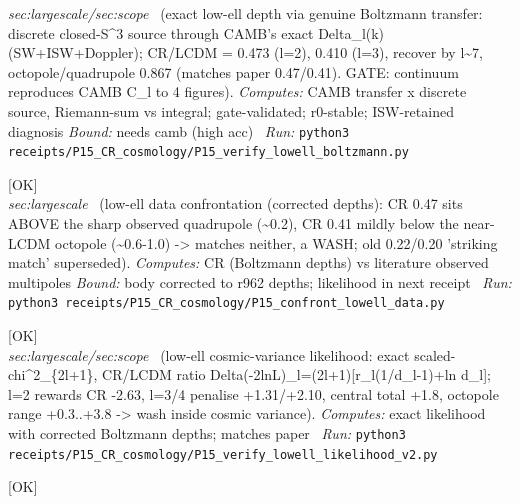 \begin{description}
\textit{sec:largescale/sec:scope} \ (exact low-ell depth via genuine Boltzmann transfer: discrete closed-S\textasciicircum{}3 source through CAMB's exact Delta\_l(k) (SW+ISW+Doppler); CR/LCDM = 0.473 (l=2), 0.410 (l=3), recover by l\textasciitilde{}7, octopole/quadrupole 0.867 (matches paper 0.47/0.41). GATE: continuum reproduces CAMB C\_l to 4 figures). 
\emph{Computes:} CAMB transfer x discrete source, Riemann-sum vs integral; gate-validated; r0-stable; ISW-retained diagnosis
 \emph{Bound:} needs camb (high acc)
\ \emph{Run:} \texttt{python3 receipts/P15\_CR\_cosmology/P15\_verify\_lowell\_boltzmann.py}
\item[\label{rcpt:P15_confront_lowell_data}\texttt{P15\_confront\_lowell\_data}]\hfill\textsf{[OK]}\\
\textit{sec:largescale} \ (low-ell data confrontation (corrected depths): CR 0.47 sits ABOVE the sharp observed quadrupole (\textasciitilde{}0.2), CR 0.41 mildly below the near-LCDM octopole (\textasciitilde{}0.6-1.0) -> matches neither, a WASH; old 0.22/0.20 'striking match' superseded). 
\emph{Computes:} CR (Boltzmann depths) vs literature observed multipoles
 \emph{Bound:} body corrected to r962 depths; likelihood in next receipt
\ \emph{Run:} \texttt{python3 receipts/P15\_CR\_cosmology/P15\_confront\_lowell\_data.py}
\item[\label{rcpt:P15_verify_lowell_likelihood_v2}\texttt{P15\_verify\_lowell\_likelihood\_v2}]\hfill\textsf{[OK]}\\
\textit{sec:largescale/sec:scope} \ (low-ell cosmic-variance likelihood: exact scaled-chi\textasciicircum{}2\_\{2l+1\}, CR/LCDM ratio Delta(-2lnL)\_l=(2l+1)[r\_l(1/d\_l-1)+ln d\_l]; l=2 rewards CR -2.63, l=3/4 penalise +1.31/+2.10, central total +1.8, octopole range +0.3..+3.8 -> wash inside cosmic variance). 
\emph{Computes:} exact likelihood with corrected Boltzmann depths; matches paper
\ \emph{Run:} \texttt{python3 receipts/P15\_CR\_cosmology/P15\_verify\_lowell\_likelihood\_v2.py}
\item[\label{rcpt:P15_the_low_ell_minimum_is_at_ell_four}\texttt{P15\_the\_low\_ell\_minimum\_is\_at\_ell\_four}]\hfill\textsf{[OK]}\\

\end{description}
